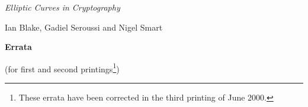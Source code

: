 
\newcommand{\asn}{\mbox{$\,\leftarrow$\,}}

%
%



\begin{center}

\vspace{0.5in}

{\Large\em Elliptic Curves in Cryptography}

\vspace{0.25in}
{\large Ian Blake, Gadiel Seroussi and Nigel Smart}

\vspace{0.5in}

{\Large\bf Errata}

(for first and second printings\footnote{These errata have been corrected in the third printing of June 2000.})

\end{center}

\vspace{0.15in}


